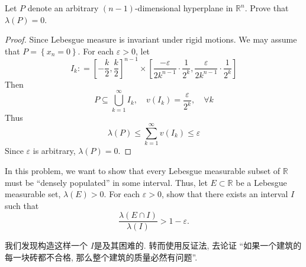 \documentclass[../main.tex]{subfiles}
\begin{document}
\begin{exercise}{}{}
Let $P$ denote an arbitrary $(n-1)$-dimensional hyperplane in $\mathbb{R}^n$. Prove that $\lambda(P) = 0$.
\end{exercise}

\begin{proof}
    Since Lebesgue measure is invariant under rigid motions. We may assume that  \(  P= \left\{ x_{n}= 0 \right\}  \). For each \(   \varepsilon > 0  \), let \[
    I _{k}: = \left[ - \frac{k }{2 } , \frac{k }{2 }  \right]^{n-1}\times  \left[  \frac{- \varepsilon  }{2 k^{n-1} }\cdot  \frac{1 }{2^{k} } , \frac{ \varepsilon  }{2 k^{n-1} } \cdot \frac{1 }{2^{k} }   \right] 
    \]   Then \[
    P \subseteq  \bigcup _{k= 1}^{\infty}I _{k},\quad v\left( I _{k} \right)= \frac{ \varepsilon  }{2^{k} }  ,\quad \forall k 
    \] Thus \[
     \lambda \left( P \right)\le \sum _{k = 1}^{\infty} v\left( I _{k} \right)\le  \varepsilon   
    \] Since \(   \varepsilon   \) is arbitrary, \(   \lambda \left( P \right)= 0   \).   
\end{proof}

\begin{exercise}{}{}
    In this problem, we want to show that every Lebesgue measurable subset of $\mathbb{R}$ must be “densely populated” in some interval. Thus, let $E \subset \mathbb{R}$ be a Lebesgue measurable set, $\lambda(E) > 0$. For each $\varepsilon > 0$, show that there exists an interval $I$ such that
\[ \frac{\lambda(E \cap I)}{\lambda(I)} > 1 - \varepsilon. \]
\end{exercise}

\begin{note}
    我们发现构造这样一个 \(  I  \)是及其困难的. 转而使用反证法, 去论证 ``如果一个建筑的每一块砖都不合格, 那么整个建筑的质量必然有问题''.
\end{note}
\end{document}
